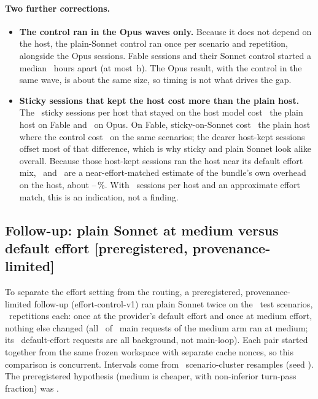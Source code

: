 \paragraph{Two further corrections.}
\begin{itemize}
  \item \textbf{The control ran in the Opus waves only.} Because it does not depend on the host, the plain-Sonnet
    control ran once per scenario and repetition, alongside the Opus sessions. Fable sessions and their Sonnet
    control started a median \RvSonnetWaveMedianH\ hours apart (at most \RvSonnetWaveMaxH\,h). The Opus result,
    with the control in the same wave, is about the same size, so timing is not what drives the gap.
  \item \textbf{Sticky sessions that kept the host cost more than the plain host.} The \RvStickyHostNFable\ sticky
    sessions per host that stayed on the host model cost \RvStickyHostFable\X\ the plain host on Fable and
    \RvStickyHostOpus\X\ on Opus. On Fable, sticky-on-Sonnet cost \RvEffVsAnchorFable\X\ the plain host where the
    control cost \RvCtlVsAnchorFable\X\ on the same scenarios; the dearer host-kept sessions offset most of that
    difference, which is why sticky and plain Sonnet look alike overall. Because those host-kept sessions ran the
    host near its default effort mix, \RvStickyHostFable\X\ and \RvStickyHostOpus\X\ are a near-effort-matched estimate
    of the bundle's own overhead on the host, about \RgOverheadFable--\RgOverheadOpus\,\%. With \RvStickyHostNFable\
    sessions per host and an approximate effort match, this is an indication, not a finding.
\end{itemize}

\subsection{Follow-up: plain Sonnet at medium versus default effort \texorpdfstring{[preregistered, provenance-limited]}{[preregistered, provenance-limited]}}\label{sec:effortfollow}

To separate the effort setting from the routing, a preregistered, provenance-limited follow-up (effort-control-v1) ran plain Sonnet
twice on the \EcScen\ test scenarios, \EcReps\ repetitions each: once at the provider's default effort and once at
medium effort, nothing else changed (all \RgEcMainMedium\ of \RgEcMainTotal\ main requests of the medium arm ran at
medium; its \RgEcNonMainDefault\ default-effort requests are all background, not main-loop). Each pair started together from the same frozen workspace with separate cache
nonces, so this comparison is concurrent. Intervals come from \EcResamples\ scenario-cluster resamples (seed
\EcSeed). The preregistered hypothesis (medium is cheaper, with non-inferior turn-pass fraction) was \EcHE.

